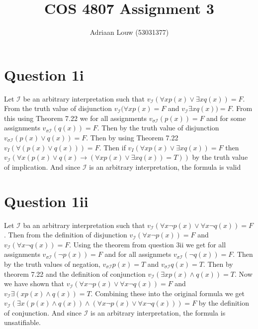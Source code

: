 \documentclass[10pt,a4paper]{article}
\title{COS 4807 Assignment 3}
\author{Adriaan Louw (53031377)}
\newcommand{\interp}{\mathscr{I}}
\begin{document}
\maketitle


\section{Question 1i}
Let $\interp$ be an arbitrary interpretation such that $v_\interp(\forall x p(x)\vee\exists x q(x))=F$. From the truth value of disjunction $v_\interp(\forall xp(x) = F $ and $v_\interp\exists x q(x)) = F$. From this using Theorem 7.22 we for all assignments $v_{\sigma\interp}(p(x)) = F$ and for some assignments $v_{\sigma\interp}(q(x)) = F$. Then by the truth value of disjunction $v_{\sigma\interp}(p(x)\vee q(x)) = F$. Then by using Theorem 7.22 $v_I(\forall(p(x)\vee q(x))) = F$. Then if $v_I(\forall x p(x) \vee \exists x q(x)) = F$ then $v_\interp (\forall x(p(x)\vee q(x) \rightarrow(\forall x p(x)\vee \exists x q(x)) = T))$ by the truth value of implication. And since $\interp$ is an arbitrary interpretation, the formula is valid

\section{Question 1ii}
Let $\interp$ ba an arbitrary interpretation such that $v_\interp (\forall x \neg p(x)\vee\forall x \neg q(x))= F$. Then from the definition of disjunction $v_\interp (\forall x \neg p(x)) = F$ and $v_\interp (\forall x\neg q(x))=F$. Using the theorem from question 3ii we get for all assignments $v_{\sigma\interp} (\neg p(x))=F$ and for all assignmets $v_{\sigma\interp}(\neg q(x))=F$. Then by the truth values of negation, $v_{\sigma\interp}p(x) =T$ and $v_{\sigma\interp}q(x)= T$. Then by theorem 7.22 and the definition of conjunction $v_\interp (\exists x p(x)\wedge q(x))=T$. Now we have shown that  $v_\interp (\forall x \neg p(x)\vee\forall x \neg q(x))= F$ and $v_\interp \exists (x p(x)\wedge q(x))=T$. Combining these into the original formula we get $v_\interp( \exists x (p(x)\wedge q(x)) \wedge (\forall x \neg p(x)\vee\forall x \neg q(x)))= F$ by the definition of conjunction. And since $\interp$ is an arbitrary interpretation, the formula is unsatifiable.
\end{document}
